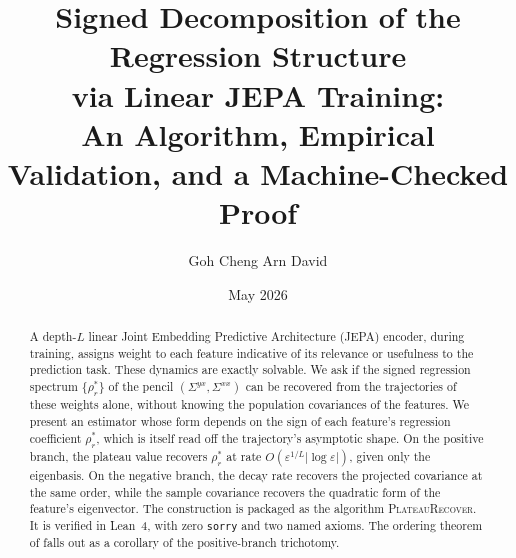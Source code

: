 \documentclass[reqno,11pt]{amsart}
\newcommand{\Sxx}{\Sigma^{xx}}
\newcommand{\Syx}{\Sigma^{yx}}
\newcommand{\eps}{\varepsilon}
\newcommand{\rhostar}{\rho_r^*}
\theoremstyle{plain}
\theoremstyle{definition}
\theoremstyle{remark}
\begin{document}
\title[Signed Decomposition via Linear JEPA Training]
      {Signed Decomposition of the Regression Structure\\
       via Linear JEPA Training:\\
       An Algorithm, Empirical Validation, and a Machine-Checked Proof}

\author{Goh Cheng Arn David}
\address{Department of Computer Science, University of Toronto}
\date{May 2026}

\begin{abstract}
A depth-$L$ linear Joint Embedding Predictive Architecture (JEPA) encoder, during
training, assigns weight to each
feature indicative of its relevance or usefulness to the prediction
task. These dynamics are exactly solvable.
We ask if the signed regression spectrum $\{\rhostar\}$ of the pencil
$(\Syx, \Sxx)$ can be recovered from the trajectories of these weights
alone, without knowing the population covariances of the features.
We present an estimator whose form depends on the sign of each
feature's regression coefficient $\rhostar$, which is itself read off
the trajectory's asymptotic shape.
On the positive branch, the plateau value recovers $\rhostar$ at rate
$O(\eps^{1/L}|\log\eps|)$, given only the eigenbasis.
On the negative branch, the decay rate recovers the projected
covariance at the same order, while the sample covariance recovers the
quadratic form of the feature's eigenvector.
The construction is packaged as the algorithm \textsc{PlateauRecover}.
It is verified in Lean~4, with zero \texttt{sorry} and two named axioms.
The ordering theorem of \citet{Goh2026ordering} falls out as a
corollary of the positive-branch trichotomy.
\end{abstract}

\maketitle















\appendix




\end{document}
